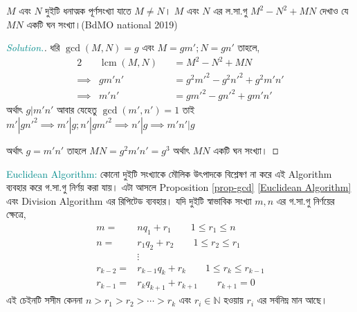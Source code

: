 \documentclass[a4paper,11pt]{article}
\DeclareMathOperator{\lcm}{lcm}
\newenvironment{sltn}{\begin{proof}[\emph{\textcolor{darkcyan}{Solution.}}]} {\end{proof}}
\begin{document}
\begin{xmpl}
	$M$ এবং $N$ দুইটি ধনাত্মক পূর্ণসংখ্যা যাতে $M \neq N$। $M$ এবং $N$ এর ল.সা.গু $M^2-N^2+MN$ দেখাও যে $MN$ একটি ঘন সংখ্যা।(BdMO national 2019)
\end{xmpl}
\begin{sltn}
	ধরি $\gcd(M,N)=g$ এবং $M=gm'; N=gn'$ তাহলে,
	\begin{alignat*}{2}
		         & \lcm(M,N) &  & =M^2-N^2+MN              \\
		\implies & gm'n'     &  & =g^2m'^2-g^2n'^2+g^2m'n' \\
		\implies & m'n'      &  & =gm'^2-gn'^2+gm'n'
	\end{alignat*}
	অর্থাৎ $g|m'n'$ আবার যেহেতু $\gcd(m',n')=1$ তাই $m'|gn'^2\implies m'|g; n'|gm'^2\implies n'|g \implies m'n'|g$
	
	অর্থাৎ $g=m'n'$ তাহলে $MN=g^2m'n'=g^3$ অর্থাৎ $MN$ একটি ঘন সংখ্যা। 
\end{sltn}
\textcolor{darkcyan}{Euclidean Algorithm:} কোনো দুইটি সংখ্যাকে মৌলিক উৎপাদকে বিশ্লেষণ না করে এই Algorithm ব্যবহার করে গ.সা.গু নির্ণয় করা যায়। এটা আসলে Proposition \ref{prop-gcd} \ref{Euclidean Algorithm} এবং Division Algorithm এর রিপিটেড ব্যবহার। যদি দুইটি স্বাভাবিক সংখ্যা $m,n$ এর গ.সা.গু নির্ণয়ের ক্ষেত্রে, 
\begin{align*}
	m =       & nq_1+r_1 \qquad 1 \leq r_1 \leq n             \\
	n =       & r_1q_2+r_2 \qquad 1 \leq r_2 \leq r_1         \\
	          & \vdots                                        \\
	r_{k-2} = & r_{k-1}q_k+r_k \qquad 1 \leq r_k \leq r_{k-1} \\
	r_{k-1} = & r_{k}q_{k+1}+r_{k+1} \qquad r_{k+1} =0
\end{align*}
এই চেইনটি সসীম কেননা $n>r_1>r_2>\cdots>r_k$ এবং $r_i \in \mathbb{N}$ হওয়ায় $r_i$ এর সর্বনিম্ন মান আছে। 
\end{document}
